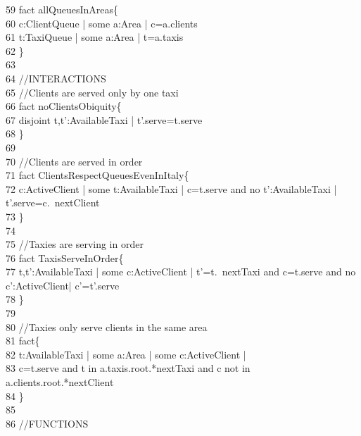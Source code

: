    59	{\color{blue}fact} allQueuesInAreas\{\\
    60	\- c:ClientQueue | {\color{blue}some} a:Area | c=a.clients\\
    61	\- t:TaxiQueue | {\color{blue}some} a:Area | t=a.taxis\\
    62	\}\\
    63	\\
    64	{\color{green}//INTERACTIONS}\\
    65	{\color{green}//Clients are served only by one taxi}\\
    66	{\color{blue}fact} noClientsObiquity\{\\
    67	\- disjoint t,t':AvailableTaxi | t'.serve=t.serve\\
    68	\}\\
    69	\\
    70	{\color{green}//Clients are served in order}\\
    71	{\color{blue}fact} ClientsRespectQueuesEvenInItaly\{\\
    72	\- c:ActiveClient | {\color{blue}some} t:AvailableTaxi | c=t.serve {\color{blue}and} no t':AvailableTaxi | t'.serve=c.~nextClient \\
    73	\}\\
    74	\\
    75	{\color{green}//Taxies are serving in order}\\
    76	{\color{blue}fact} TaxisServeInOrder\{\\
    77	\- t,t':AvailableTaxi | {\color{blue}some} c:ActiveClient | t'=t.~nextTaxi {\color{blue}and} c=t.serve {\color{blue}and} no c':ActiveClient| c'=t'.serve\\
    78	\}\\
    79	\\
    80	{\color{green}//Taxies only serve clients in the same area}\\
    81	fact\{\\
    82	\- t:AvailableTaxi | {\color{blue}some} a:Area | {\color{blue}some} c:ActiveClient | \\
    83	\-\qquad c=t.serve {\color{blue}and} t {\color{blue}in} a.taxis.root.*nextTaxi {\color{blue}and} c {\color{blue}not} in a.clients.root.*nextClient\\
    84	\}\\
    85	\\
    86	{\color{green}//FUNCTIONS}\\
